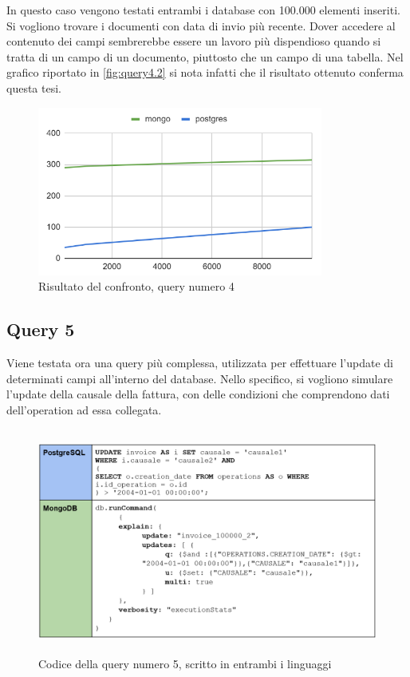 \noindent In questo caso vengono testati entrambi i database con 100.000 elementi inseriti.\\
Si vogliono trovare i documenti con data di invio più recente. Dover accedere al contenuto dei campi sembrerebbe essere un lavoro più dispendioso quando si tratta di un campo di un documento, piuttosto che un campo di una tabella. Nel grafico riportato in \autoref{fig:query4.2} si nota infatti che il risultato ottenuto conferma questa tesi.\\

\begin{figure}[htbp]
\begin{center}
\includegraphics[height=15em]{immagini/query/query4_results.png}
\caption{Risultato del confronto, query numero 4}
\label{fig:query4.2}
\end{center}
\end{figure}


\subsection{Query 5}
Viene testata ora una query più complessa, utilizzata per effettuare l'update di determinati campi all'interno del database. Nello specifico, si vogliono simulare l'update della causale della fattura, con delle condizioni che comprendono dati dell'operation ad essa collegata.\\

\begin{figure}[htbp]
\begin{center}
\includegraphics[height=20em]{immagini/query/query5.png}
\caption{Codice della query numero 5, scritto in entrambi i linguaggi}
\label{fig:query5}
\end{center}
\end{figure}

